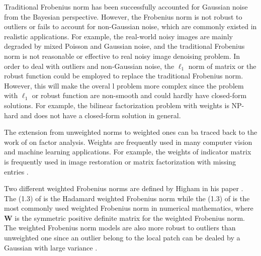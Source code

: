 \documentclass[10pt,twocolumn,letterpaper]{article}
\begin{document}
Traditional Frobenius norm has been successfully accounted for Gaussian noise from the Bayesian perspective. However, the Frobenius norm is not robust to outliers or fails to account for non-Gaussian noise, which are commonly existed in realistic applications. For example, the real-world noisy images are mainly degraded by mixed Poisson and Gaussian noise, and the traditional Frobenius norm is not reasonable or effective to real noisy image denoising problem. In order to deal with outliers and non-Gaussian noise, the $\ell_{1}$ norm of matrix or the robust function \cite{huber1973robust} could be employed to replace the traditional Frobenius norm. However, this will make the overal  l problem more complex since the problem with $\ell_{1}$ or robust function are non-smooth and could hardly have closed-form solutions. For example, the bilinear factorization problem with weights \cite{srebro2003weighted} is NP-hard and does not have a closed-form solution in general. 

The extension from unweighted norms to weighted ones can ba traced back to the work of \cite{young1941maximum} on factor analysis. Weights are frequently used in many computer vision and machine learning applications. For example, the weights of indicator matrix is frequently used in image restoration \cite{} or matrix factorization with missing entries \cite{srebro2003weighted}. 


Two different weighted Frobenius norms are defined by Higham in his paper \cite{higham2002computing}. The (1.3) of \cite{higham2002computing} is the Hadamard weighted Frobenius norm while the (1.3) of \cite{higham2002computing} is the most commonly used weighted Frobenius norm in numerical mathematics, where $\mathbf{W}$ is the symmetric positive definite matrix for the weighted Frobenius norm. The weighted Frobenius norm models are also more robust to outliers than unweighted one since an outlier belong to the local patch can be dealed by a Gaussian with large variance \cite{meng2013robust}.
\end{document}
